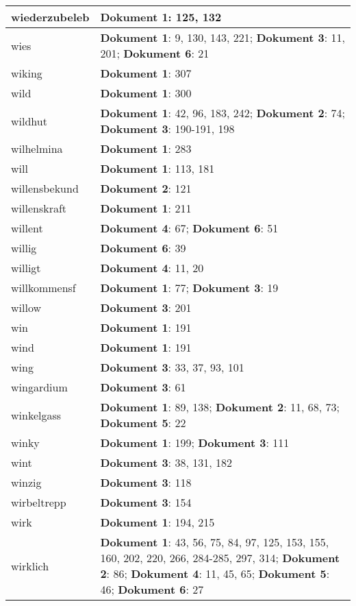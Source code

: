 \documentclass[a5paper]{article}
\begin{document}
\begin{longtable}[l]{|l|p{3in}|}
\hline
wiederzubeleb & \textbf{Dokument 1}: 125, 132 \\
\hline
wies & \textbf{Dokument 1}: 9, 130, 143, 221; \textbf{Dokument 3}: 11, 201; \textbf{Dokument 6}: 21 \\
\hline
wiking & \textbf{Dokument 1}: 307 \\
\hline
wild & \textbf{Dokument 1}: 300 \\
\hline
wildhut & \textbf{Dokument 1}: 42, 96, 183, 242; \textbf{Dokument 2}: 74; \textbf{Dokument 3}: 190-191, 198 \\
\hline
wilhelmina & \textbf{Dokument 1}: 283 \\
\hline
will & \textbf{Dokument 1}: 113, 181 \\
\hline
willensbekund & \textbf{Dokument 2}: 121 \\
\hline
willenskraft & \textbf{Dokument 1}: 211 \\
\hline
willent & \textbf{Dokument 4}: 67; \textbf{Dokument 6}: 51 \\
\hline
willig & \textbf{Dokument 6}: 39 \\
\hline
willigt & \textbf{Dokument 4}: 11, 20 \\
\hline
willkommensf & \textbf{Dokument 1}: 77; \textbf{Dokument 3}: 19 \\
\hline
willow & \textbf{Dokument 3}: 201 \\
\hline
win & \textbf{Dokument 1}: 191 \\
\hline
wind & \textbf{Dokument 1}: 191 \\
\hline
wing & \textbf{Dokument 3}: 33, 37, 93, 101 \\
\hline
wingardium & \textbf{Dokument 3}: 61 \\
\hline
winkelgass & \textbf{Dokument 1}: 89, 138; \textbf{Dokument 2}: 11, 68, 73; \textbf{Dokument 5}: 22 \\
\hline
winky & \textbf{Dokument 1}: 199; \textbf{Dokument 3}: 111 \\
\hline
wint & \textbf{Dokument 3}: 38, 131, 182 \\
\hline
winzig & \textbf{Dokument 3}: 118 \\
\hline
wirbeltrepp & \textbf{Dokument 3}: 154 \\
\hline
wirk & \textbf{Dokument 1}: 194, 215 \\
\hline
wirklich & \textbf{Dokument 1}: 43, 56, 75, 84, 97, 125, 153, 155, 160, 202, 220, 266, 284-285, 297, 314; \textbf{Dokument 2}: 86; \textbf{Dokument 4}: 11, 45, 65; \textbf{Dokument 5}: 46; \textbf{Dokument 6}: 27 \\

\end{longtable}
\end{document}
